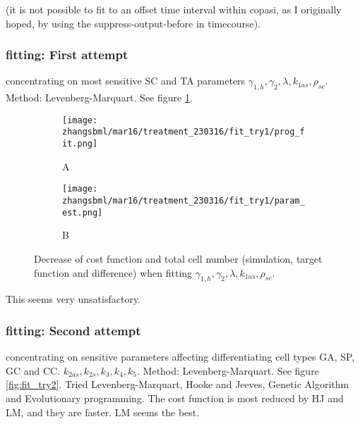 \documentclass[a4paper,10pt]{report}
\newcommand{\psortbase}{/home/ngrs2/work/bsu/PSORT_Zuliani_Reynolds/}
\newcommand{\sbmlbase}{\psortbase/sbml-sh/}
\newcommand{\zhangsbml}{\sbmlbase/zhang_model}
\begin{document}
(it is not possible to fit to an offset time interval within copasi, 
as I originally hoped, by using the suppress-output-before in timecourse). 

\subsubsection{fitting: First attempt}

concentrating on most sensitive SC and TA parameters
$\gamma_{1,h}, \gamma_{2}, \lambda, k_{1as}, \rho_{sc}$. Method: Levenberg-Marquart. See figure \ref{fig:fit_try1}. 

\begin{figure}[h!]
  \begin{subfigure}{\textwidth}
    \texttt{[image: \\zhangsbml/mar16/treatment\_230316/fit\_try1/prog\_fit.png]}
    \caption{A}
  \end{subfigure}
  \begin{subfigure}{\textwidth}
    \centering
    \texttt{[image: \\zhangsbml/mar16/treatment\_230316/fit\_try1/param\_est.png]}
    \caption{B}
  \end{subfigure}
  \caption{Decrease of cost function and total cell number (simulation, target function and difference) when fitting $\gamma_{1,h}, \gamma_{2}, \lambda, k_{1as}, \rho_{sc}$.}
  \label{fig:fit_try1}
\end{figure}

This seems very unsatisfactory. 

\subsubsection{fitting: Second attempt}
 concentrating on sensitive parameters affecting differentiating cell types GA, SP, GC and CC. 
$k_{2as},k_{2s},k_{3},k_{4}, k_{5}$. Method: Levenberg-Marquart. See figure \ref{fig:fit_try2}. 
Tried Levenberg-Marquart, Hooke and Jeeves, Genetic Algorithm and Evolutionary programming. The cost function is most reduced by HJ and LM, and they are faster. LM seems the best. 
\end{document}
